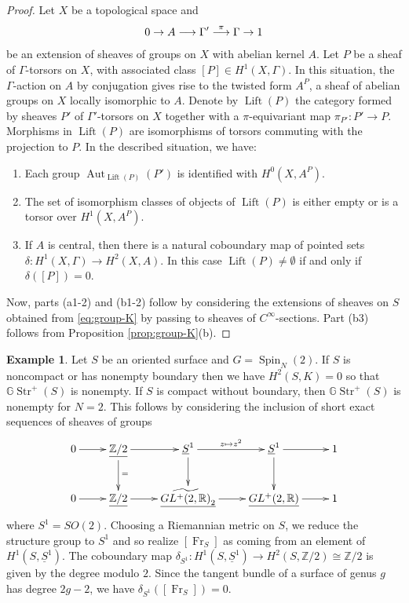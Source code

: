\documentclass[english,11pt,leqno]{article}
\def\GG{\mathbb{G}}
\def\RR{\mathbb{R}}
\def\ZZ{\mathbb{Z}}
\def\Aut{\operatorname{Aut}\nolimits}
\def\on{\operatorname}
\def\lra{\longrightarrow}
\def\Fr{\on{Fr}}
\def\Gstr{\GG\on{Str}}
\theoremstyle{definition}
\newtheorem{exa}[thm]{Example}
\theoremstyle{remark}
\numberwithin{equation}{section}
\begin{document}
\begin{proof} Let $X$ be a topological space
and
\[
0\to A\lra\Gamma'\buildrel\pi\over\lra \Gamma\to 1
\]
be an extension of sheaves of groups on $X$ with abelian kernel $A$. Let $P$ be a sheaf of $\Gamma$-torsors
on $X$, with associated class $[P]\in H^1(X, \Gamma)$.
 In this situation, the $\Gamma$-action on $A$ by conjugation gives rise to the twisted form
$A^P$, a sheaf of abelian groups on $X$ locally isomorphic to $A$. Denote by $\on{Lift}(P)$ the category
formed by sheaves $P'$ of $\Gamma'$-torsors on $X$ together with a $\pi$-equivariant 
map $\pi_{P'}: P'\to P$. Morphisms in $\on{Lift}(P)$ are isomorphisms of torsors
commuting with the projection to $P$. 
In the described situation, we have:
\begin{enumerate}
\item[(i)] Each group $\Aut_{\on{Lift}(P)}(P')$ is identified with $H^0(X, A^P)$.

\item[(ii)] The set of isomorphism classes of objects of $\on{Lift}(P)$ is either empty or is
a torsor over $H^1(X, A^P)$.

\item[(iii)] If $A$ is central, then there is a natural coboundary map of pointed sets
$\delta: H^1(X,\Gamma)\to H^2(X, A)$.
In this case $\on{Lift}(P)\neq\emptyset$ if and only if $\delta([P])=0$. 
\end{enumerate}
Now, parts (a1-2) and (b1-2) follow by considering the extensions of sheaves
on $S$ obtained from \eqref{eq:group-K} by passing to sheaves of $C^\infty$-sections. Part (b3) follows from
Proposition \ref{prop:group-K}(b). 
\end{proof}

\begin{exa} Let $S$ be an oriented surface and $G=\on{Spin}_N(2)$. If $S$ is noncompact or has
	nonempty boundary then we have $H^2(S,K) = 0$ so that $\Gstr^+(S)$ is nonempty. If $S$ is
	compact without boundary, then $\Gstr^+(S)$ is nonempty for $N=2$.
	This follows by considering the inclusion of short exact sequences of sheaves of groups
	\begin{equation}
		\label{eq;two-seq}
		\xymatrix{
			0\ar[r]& \underline{\ZZ/2}\ar[r]\ar[d]^{=}&\underline{S}^1\ar[d] \ar[r]^{z
			\mapsto z^2} & \underline{S}^1\ar[d]\ar[r] & 1
			\\
			0\ar[r]& \underline{\ZZ/2}\ar[r]&\underline{\widetilde {GL^+(2,\RR)}_2}\ar[r] & \underline {GL^+(2,\RR)}\ar[r] & 1
		}
	\end{equation}
	where $S^1=SO(2)$. Choosing a Riemannian metric on $S$, we reduce the structure group to $S^1$
	and so realize $[\Fr_S]$ as coming from an element of $H^1(S, \underline{S}^1)$. The coboundary map 
	$\delta_{S^1}: H^1(S, \underline S^1)\to H^2(S, \ZZ/2) \cong \ZZ/2$ is given by the degree
	modulo $2$. Since the tangent bundle of a surface of genus $g$ has degree $2g -2$, we have
	$\delta_{S^1}([\Fr_S]) = 0$.
\end{exa}
\end{document}
